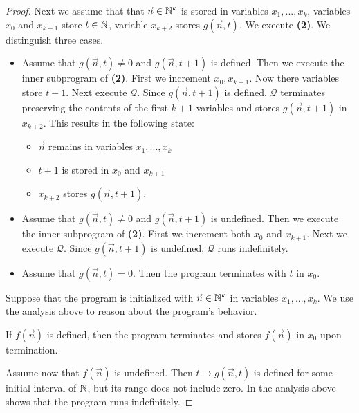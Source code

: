 \documentclass[10pt]{amsart}
\begin{document}
\begin{proof}
	Next we assume that that $\vec{n} \in {\mathbb N}^k$ is stored in variables $x_1,...,x_k$, variables $x_0$ and $x_{k + 1}$ store $t \in {\mathbb N}$, variable $x_{k+2}$ stores $g(\vec{n},t)$. We execute \textbf{(2)}. We distinguish three cases.
	\begin{itemize}
		\item Assume that $g(\vec{n},t)\neq 0$ and $g(\vec{n},t + 1)$ is defined. Then we execute the inner subprogram of \textbf{(2)}. First we increment $x_0,x_{k+1}$. Now there variables store $t+1$. Next execute $\mathcal{Q}$. Since $g(\vec{n},t + 1)$ is defined, $\mathcal{Q}$ terminates preserving the contents of the first $k + 1$ variables and stores $g(\vec{n},t+1)$ in $x_{k + 2}$. This results in the following state:
		      \begin{itemize}
			      \item[] $\vec{n}$ remains in variables $x_1,...,x_k$
			      \item[] $t + 1$ is stored in $x_0$ and $x_{k + 1}$
			      \item[] $x_{k+2}$ stores $g(\vec{n},t+1)$.
		      \end{itemize}
		\item Assume that $g(\vec{n},t)\neq 0$ and $g(\vec{n},t+1)$ is undefined. Then we execute the inner subprogram of \textbf{(2)}. First we increment both $x_0$ and $x_{k+1}$. Next we execute $\mathcal{Q}$. Since $g(\vec{n},t + 1)$ is undefined, $\mathcal{Q}$ runs indefinitely.
		\item Assume that $g(\vec{n},t) = 0$. Then the program terminates with $t$ in $x_0$.
	\end{itemize}
	Suppose that the program is initialized with $\vec{n} \in {\mathbb N}^k$ in variables $x_1,...,x_k$. We use the analysis above to reason about the program's behavior.

	If $f(\vec{n})$ is defined, then the program terminates and stores $f(\vec{n})$ in $x_0$ upon termination.

	Assume now that $f(\vec{n})$ is undefined. Then $t \mapsto g(\vec{n},t)$ is defined for some initial interval of ${\mathbb N}$, but its range does not include zero. In the analysis above shows that the program runs indefinitely.
\end{proof}
\end{document}
